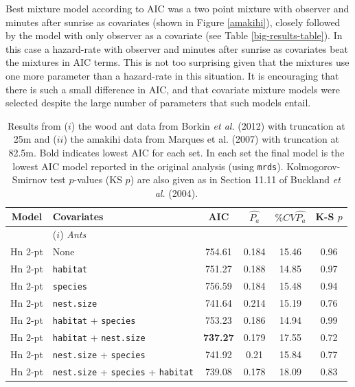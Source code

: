 \documentclass[useAMS,referee]{biom}
\begin{document}
Best mixture model according to AIC was a two point mixture with observer and minutes after sunrise as covariates (shown in Figure \ref{amakihi}), closely followed by the model with only observer as a covariate (see Table \ref{big-results-table}). In this case a hazard-rate with observer and minutes after sunrise as covariates beat the mixtures in AIC terms. This is not too surprising given that the mixtures use one more parameter than a hazard-rate in this situation. It is encouraging that there is such a small difference in AIC, and that covariate mixture models were selected despite the large number of parameters that such models entail.


\begin{table}
\caption{Results from ($i$) the wood ant data from Borkin \textit{et al.} (2012) with truncation at 25m and ($ii$) the amakihi data from Marques et al. (2007) with truncation at 82.5m. Bold indicates lowest AIC for each set. In each set the final model is the lowest AIC model reported in the original analysis (using \texttt{mrds}). Kolmogorov-Smirnov test $p$-values (KS $p$) are also given as in Section 11.11 of Buckland \textit{et al.} (2004). }
\centering
\begin{tabular}{c l c c c c}
\hline \hline
Model & Covariates & AIC & $\hat{P_a}$ & $\% CV \hat{P_a}$ & K-S $p$\\
\hline
 & ($i$) \textit{Ants} & & & & \\
Hn 2-pt  &  None  &  754.61  &  0.184  &  15.46  &  0.96 \\
Hn 2-pt  &   \texttt{habitat} &  751.27  &  0.188  &  14.85  &  0.97 \\
Hn 2-pt  &   \texttt{species} &  756.59  &  0.184  &  15.48  &  0.94 \\
Hn 2-pt  &  \texttt{nest.size} &  741.64  &  0.214  &  15.19  &  0.76 \\
Hn 2-pt  &  \texttt{habitat} + \texttt{species} &  753.23  &  0.186  &  14.94  &  0.99 \\
Hn 2-pt  &  \texttt{habitat} + \texttt{nest.size}  &  \textbf{737.27}  &  0.179  &  17.55  &  0.72 \\
Hn 2-pt  & \texttt{nest.size} + \texttt{species}   &  741.92  &  0.21  &  15.84  &  0.77 \\
Hn 2-pt  &  \texttt{nest.size} + \texttt{species} + \texttt{habitat}  &  739.08  &  0.178  &  18.09  &  0.83 \\

\end{tabular}
\end{table}
\end{document}
